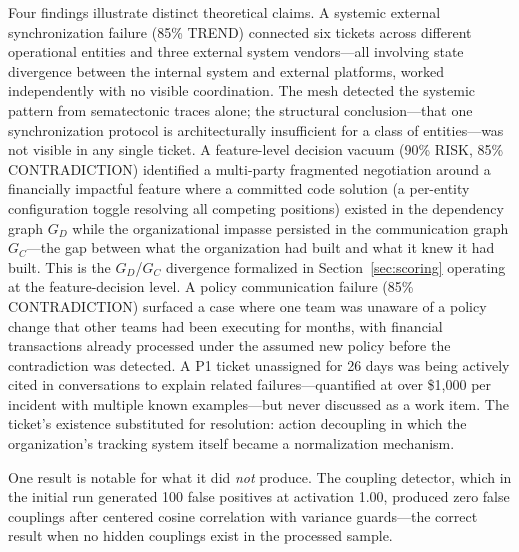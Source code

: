\documentclass[11pt,a4paper]{article}
\begin{document}
Four findings illustrate distinct theoretical claims. A systemic external synchronization failure (85\% TREND) connected six tickets across different operational entities and three external system vendors---all involving state divergence between the internal system and external platforms, worked independently with no visible coordination. The mesh detected the systemic pattern from sematectonic traces alone; the structural conclusion---that one synchronization protocol is architecturally insufficient for a class of entities---was not visible in any single ticket. A feature-level decision vacuum (90\% RISK, 85\% CONTRADICTION) identified a multi-party fragmented negotiation around a financially impactful feature where a committed code solution (a per-entity configuration toggle resolving all competing positions) existed in the dependency graph $G_D$ while the organizational impasse persisted in the communication graph $G_C$---the gap between what the organization had built and what it knew it had built. This is the $G_D$/$G_C$ divergence formalized in Section~\ref{sec:scoring} operating at the feature-decision level. A policy communication failure (85\% CONTRADICTION) surfaced a case where one team was unaware of a policy change that other teams had been executing for months, with financial transactions already processed under the assumed new policy before the contradiction was detected. A P1 ticket unassigned for 26 days was being actively cited in conversations to explain related failures---quantified at over \$1,000 per incident with multiple known examples---but never discussed as a work item. The ticket's existence substituted for resolution: action decoupling in which the organization's tracking system itself became a normalization mechanism.

One result is notable for what it did \emph{not} produce. The coupling detector, which in the initial run generated 100 false positives at activation 1.00, produced zero false couplings after centered cosine correlation with variance guards---the correct result when no hidden couplings exist in the processed sample.
\end{document}
